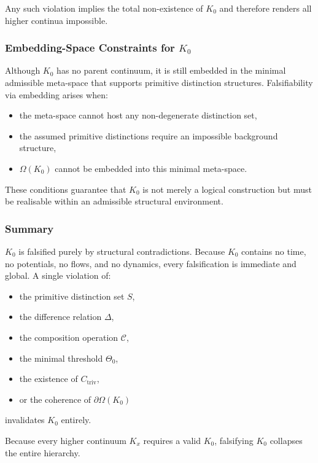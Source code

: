Any such violation implies the total non-existence of $K_0$ and therefore 
renders all higher continua impossible.



\subsubsection{Embedding-Space Constraints for \texorpdfstring{$K_0$}{K_0}}

Although $K_0$ has no parent continuum, it is still embedded in the 
minimal admissible meta-space that supports primitive distinction
structures.
Falsifiability via embedding arises when:

\begin{itemize}
    \item the meta-space cannot host any non-degenerate distinction set,
    \item the assumed primitive distinctions require an impossible 
          background structure,
    \item $\Omega(K_0)$ cannot be embedded into this minimal meta-space.
\end{itemize}

These conditions guarantee that $K_0$ is not merely a logical
construction but must be realisable within an admissible structural 
environment.



\subsubsection{Summary}

$K_0$ is falsified purely by structural contradictions.
Because $K_0$ contains no time, no potentials, no flows, and no
dynamics, every falsification is immediate and global.
A single violation of:

\begin{itemize}
    \item the primitive distinction set $S$,
    \item the difference relation $\Delta$,
    \item the composition operation $\mathcal{C}$,
    \item the minimal threshold $\Theta_0$,
    \item the existence of $C_{\mathrm{triv}}$,
    \item or the coherence of $\partial\Omega(K_0)$
\end{itemize}

invalidates $K_0$ entirely.

Because every higher continuum $K_x$ requires a valid $K_0$,
falsifying $K_0$ collapses the entire hierarchy.
